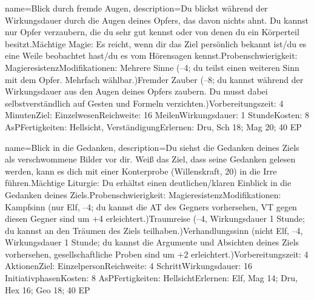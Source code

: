 {
    name={Blick durch fremde Augen},
    description={Du blickst während der Wirkungsdauer durch die Augen deines Opfers, das davon nichts ahnt. Du kannst nur Opfer verzaubern, die du sehr gut kennst oder von denen du ein Körperteil besitzt.\newline Mächtige Magie: Es reicht, wenn dir das Ziel persönlich bekannt ist/du es eine Weile beobachtet hast/du es vom Hörensagen kennst.\newline Probenschwierigkeit: Magieresistenz\newline Modifikationen: Mehrere Sinne (–4; du teilst einen weiteren Sinn mit dem Opfer. Mehrfach wählbar.)\newline Fremder Zauber (–8; du kannst während der Wirkungsdauer aus den Augen deines Opfers zaubern. Du musst dabei selbstverständlich auf Gesten und Formeln verzichten.)\newline Vorbereitungszeit: 4 Minuten\newline Ziel: Einzelwesen\newline Reichweite: 16 Meilen\newline Wirkungsdauer: 1 Stunde\newline Kosten: 8 AsP\newline Fertigkeiten: Hellsicht, Verständigung\newline Erlernen: Dru, Sch 18; Mag 20; 40 EP}
}


{
    name={Blick in die Gedanken},
    description={Du siehst die Gedanken deines Ziels als verschwommene Bilder vor dir. Weiß das Ziel, dass seine Gedanken gelesen werden, kann es dich mit einer Konterprobe (Willenskraft, 20) in die Irre führen.\newline Mächtige Liturgie: Du erhältst einen deutlichen/klaren Einblick in die Gedanken deines Ziels.\newline Probenschwierigkeit: Magieresistenz\newline Modifikationen: Kampfsinn (nur Elf, –4; du kannst die AT des Gegners vorhersehen, VT gegen diesen Gegner sind um +4 erleichtert.)\newline Traumreise (–4, Wirkungsdauer 1 Stunde; du kannst an den Träumen des Ziels teilhaben.)\newline Verhandlungssinn (nicht Elf, –4, Wirkungsdauer 1 Stunde; du kannst die Argumente und Absichten deines Ziels vorhersehen, gesellschaftliche Proben sind um +2 erleichtert.)\newline Vorbereitungszeit: 4 Aktionen\newline Ziel: Einzelperson\newline Reichweite: 4 Schritt\newline Wirkungsdauer: 16 Initiativphasen\newline Kosten: 8 AsP\newline Fertigkeiten: Hellsicht\newline Erlernen: Elf, Mag 14; Dru, Hex 16; Geo 18; 40 EP}
}


